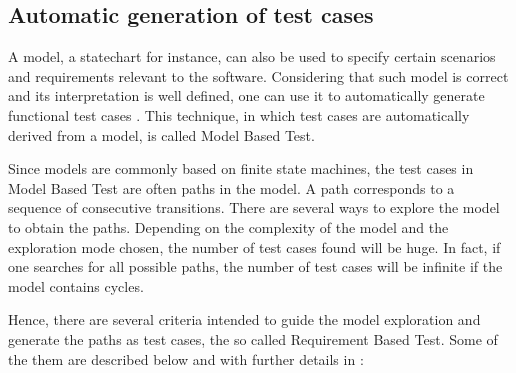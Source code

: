 \subsection{Automatic generation of test cases}
\label{sec-autotestcases}

A model, a statechart for instance, can also be used to specify certain scenarios and requirements relevant to the software. Considering that such model is correct and its interpretation is well defined, one can use it to automatically generate functional test cases \cite{Maldonado:07}. This technique, in which test cases are automatically derived from a model, is called Model Based Test\cite{inpe10}.

Since models are commonly based on finite state machines, the test cases in Model Based Test are often paths in the model. A path corresponds to a sequence of consecutive transitions. There are several ways to explore the model to obtain the paths. Depending on the complexity of the model and the exploration mode chosen, the number of test cases found will be huge. In fact, if one searches for all possible paths, the number of test cases will be infinite if the model contains cycles.

Hence, there are several criteria intended to guide the model exploration and generate the paths as test cases, the so called Requirement Based Test. Some of the them are described below and with further details in \cite{inpe10}:

